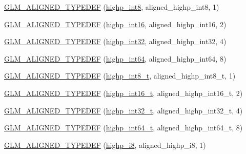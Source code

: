 \begin{DoxyCompactItemize}
\hyperlink{group__gtx__type__aligned_ga56c5ca60813027b603c7b61425a0479d}{G\+L\+M\+\_\+\+A\+L\+I\+G\+N\+E\+D\+\_\+\+T\+Y\+P\+E\+D\+E\+F} (\hyperlink{group__gtc__type__precision_ga57c86999e666760c304453f9bfdc09d1}{highp\+\_\+int8}, aligned\+\_\+highp\+\_\+int8, 1)
\item 
\hyperlink{group__gtx__type__aligned_ga7a751b3aff24c0259f4a7357c2969089}{G\+L\+M\+\_\+\+A\+L\+I\+G\+N\+E\+D\+\_\+\+T\+Y\+P\+E\+D\+E\+F} (\hyperlink{group__gtc__type__precision_gaf0430ed80e88c0d1dfbe47f359659c81}{highp\+\_\+int16}, aligned\+\_\+highp\+\_\+int16, 2)
\item 
\hyperlink{group__gtx__type__aligned_ga70cd2144351c556469ee6119e59971fc}{G\+L\+M\+\_\+\+A\+L\+I\+G\+N\+E\+D\+\_\+\+T\+Y\+P\+E\+D\+E\+F} (\hyperlink{group__gtc__type__precision_gaa2045c92b9553d463191af6a20e997bb}{highp\+\_\+int32}, aligned\+\_\+highp\+\_\+int32, 4)
\item 
\hyperlink{group__gtx__type__aligned_ga46bbf08dc004d8c433041e0b5018a5d3}{G\+L\+M\+\_\+\+A\+L\+I\+G\+N\+E\+D\+\_\+\+T\+Y\+P\+E\+D\+E\+F} (\hyperlink{group__gtc__type__precision_ga7ffb27943e9569800979081bc548621c}{highp\+\_\+int64}, aligned\+\_\+highp\+\_\+int64, 8)
\item 
\hyperlink{group__gtx__type__aligned_gab3e10c77a20d1abad2de1c561c7a5c18}{G\+L\+M\+\_\+\+A\+L\+I\+G\+N\+E\+D\+\_\+\+T\+Y\+P\+E\+D\+E\+F} (\hyperlink{group__gtc__type__precision_ga417701b99e6e7992f35ab2ef694f88b2}{highp\+\_\+int8\+\_\+t}, aligned\+\_\+highp\+\_\+int8\+\_\+t, 1)
\item 
\hyperlink{group__gtx__type__aligned_ga968f30319ebeaca9ebcd3a25a8e139fb}{G\+L\+M\+\_\+\+A\+L\+I\+G\+N\+E\+D\+\_\+\+T\+Y\+P\+E\+D\+E\+F} (\hyperlink{group__gtc__type__precision_ga07d318d61472e75238e53b9642227672}{highp\+\_\+int16\+\_\+t}, aligned\+\_\+highp\+\_\+int16\+\_\+t, 2)
\item 
\hyperlink{group__gtx__type__aligned_gaae773c28e6390c6aa76f5b678b7098a3}{G\+L\+M\+\_\+\+A\+L\+I\+G\+N\+E\+D\+\_\+\+T\+Y\+P\+E\+D\+E\+F} (\hyperlink{group__gtc__type__precision_ga783d077a513c1f475f6cdb406b4238c3}{highp\+\_\+int32\+\_\+t}, aligned\+\_\+highp\+\_\+int32\+\_\+t, 4)
\item 
\hyperlink{group__gtx__type__aligned_ga790cfff1ca39d0ed696ffed980809311}{G\+L\+M\+\_\+\+A\+L\+I\+G\+N\+E\+D\+\_\+\+T\+Y\+P\+E\+D\+E\+F} (\hyperlink{group__gtc__type__precision_ga0f5186bde44471133b08057cae8a51ac}{highp\+\_\+int64\+\_\+t}, aligned\+\_\+highp\+\_\+int64\+\_\+t, 8)
\item 
\hyperlink{group__gtx__type__aligned_ga8265b91eb23c120a9b0c3e381bc37b96}{G\+L\+M\+\_\+\+A\+L\+I\+G\+N\+E\+D\+\_\+\+T\+Y\+P\+E\+D\+E\+F} (\hyperlink{group__gtc__type__precision_ga8b9eb0b24cce7f14478bfcacb53ce839}{highp\+\_\+i8}, aligned\+\_\+highp\+\_\+i8, 1)

\end{DoxyCompactItemize}
